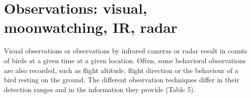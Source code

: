 \documentclass[
]{book}
\begin{document}
\hypertarget{observations-visual-moonwatching-ir-radar}{%
\section{Observations: visual, moonwatching, IR, radar}\label{observations-visual-moonwatching-ir-radar}}

Visual observations or observations by infrared cameras or radar result in counts of birds at a given time at a given location. Often, some behavioral observations are also recorded, such as flight altitude, flight direction or the behaviour of a bird resting on the ground. The different observation techniques differ in their detection ranges and in the information they provide (Table 5).

\begin{table}


\end{table}
\end{document}
